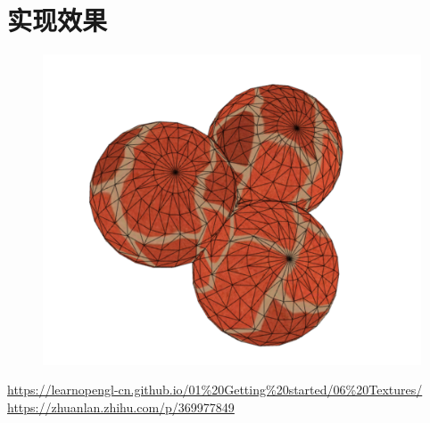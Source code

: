 \documentclass[12pt]{article}
\begin{document}
\section{实现效果}
\begin{figure}[htbp]
    \centering
    \includegraphics[scale=0.5]{pic02.png}
\end{figure}


\begin{thebibliography}{3}
     \url{https://learnopengl-cn.github.io/01%20Getting%20started/06%20Textures/}
     \url{https://zhuanlan.zhihu.com/p/369977849}
\end{thebibliography}
\end{document}

